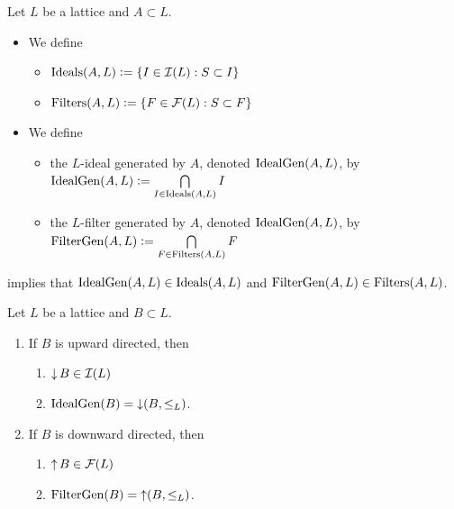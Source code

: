\documentclass{book}
\begin{document}
	\begin{defn}
		Let $L$ be a lattice and $A \subset L$.
		\begin{itemize}
			\item We define 
			\begin{itemize}
				\item $\operatorname{Ideals}(A, L) \vcentcolon= \{I \in \mathcal{I}(L): S \subset I\}$
				\item $\operatorname{Filters}(A, L) \vcentcolon= \{F \in \mathcal{F}(L): S \subset F\}$
			\end{itemize}
			\item We define 
			\begin{itemize}
				\item the $L$-ideal generated by $A$, denoted $\operatorname{IdealGen}(A, L)$, by $\operatorname{IdealGen}(A, L) \vcentcolon= \bigcap\limits_{I \in \operatorname{Ideals}(A, L)} I$
				\item the $L$-filter generated by $A$, denoted $\operatorname{IdealGen}(A, L)$, by$\operatorname{FilterGen}(A, L) \vcentcolon= \bigcap\limits_{F \in \operatorname{Filters}(A, L)} F$
			\end{itemize}
		\end{itemize}
	\end{defn}
	
	\begin{note}
		 implies that $\operatorname{IdealGen}(A, L) \in \operatorname{Ideals}(A, L)$ and $\operatorname{FilterGen}(A, L) \in \operatorname{Filters}(A, L)$.
	\end{note}
	
	
	\begin{ex}
		Let $L$ be a lattice and $B \subset L$.
		\begin{enumerate}
			\item If $B$ is upward directed, then 
			\begin{enumerate}
				\item $\operatorname{\downarrow} B \in \mathcal{I}(L)$
				\item $\operatorname{IdealGen}(B) = \operatorname{\downarrow} (B, \leq_L)$.
			\end{enumerate}
			\item If $B$ is downward directed, then 
			\begin{enumerate}
				\item $\operatorname{\uparrow} B \in \mathcal{F}(L)$
				\item $\operatorname{FilterGen}(B) = \operatorname{\uparrow} (B, \leq_L)$.
			\end{enumerate}
		\end{enumerate} 
	\end{ex}
	
\end{document}

